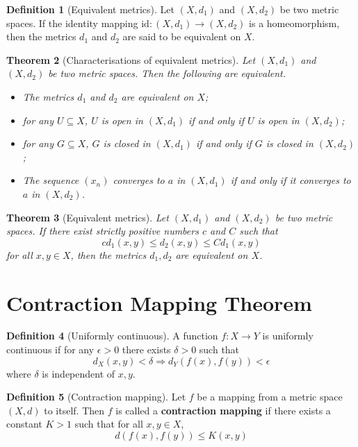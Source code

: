\documentclass[10pt, oneside, reqno]{amsart}
\theoremstyle{plain}%
\newtheorem{thm}{Theorem}[section]
\theoremstyle{definition}
\newtheorem{defn}[thm]{Definition}
\theoremstyle{remark}
\newcommand{\met}{(X,d)}
\begin{document}
\begin{defn}[Equivalent metrics]
	Let $(X, d_1)$ and $(X, d_2)$ be two metric spaces.  If the identity mapping $\text{id} : (X, d_1) \rightarrow (X, d_2)$ is a homeomorphism, then the metrics $d_1$ and $d_2$ are said to be equivalent on $X$.
\end{defn}

\begin{thm}[Characterisations of equivalent metrics]
	Let $(X, d_1)$ and $(X, d_2)$ be two metric spaces.  Then the following are equivalent.
	\begin{itemize}
		\item The metrics $d_1$ and $d_2$ are equivalent on $X$;
		\item for any $U \subseteq X$, $U$ is open in $(X, d_1)$ if and only if $U$ is open in $(X, d_2)$;
		\item for any $G \subseteq X$, $G$ is closed in $(X, d_1)$ if and only if $G$ is closed in $(X, d_2)$;
		\item The sequence $(x_n)$ converges to $a$ in $(X, d_1)$ if and only if it converges to $a$ in $(X, d_2)$.
	\end{itemize}
\end{thm}

\begin{thm}[Equivalent metrics]
	Let $(X, d_1)$ and $(X, d_2)$ be two metric spaces.  If there exist strictly positive numbers $c$ and $C$ such that \[
		c d_1(x,y) \leq d_2(x,y) \leq C d_1(x,y)
	\] for all $x,y \in X$, then the metrics $d_1, d_2$ are equivalent on $X$.
	\end{thm}

\section{Contraction Mapping Theorem} %
\label{sec:contraction_mapping_theorem}

\begin{defn}[Uniformly continuous]
	A function $f: X \rightarrow Y$ is uniformly continuous if for any $\epsilon > 0$ there exists $\delta > 0$ such that \[
		d_X(x,y) < \delta \Rightarrow d_Y(f(x), f(y)) < \epsilon
	\] where $\delta$ is independent of $x,y$.
\end{defn}

\begin{defn}[Contraction mapping]
	Let $f$ be a mapping from a metric space $\met$ to itself.  Then $f$ is called a \textbf{contraction mapping} if there exists a constant $K > 1$ such that for all $x,y \in X$, \[
		d(f(x), f(y)) \leq K (x,y)
	\] 
\end{defn}
\end{document}
